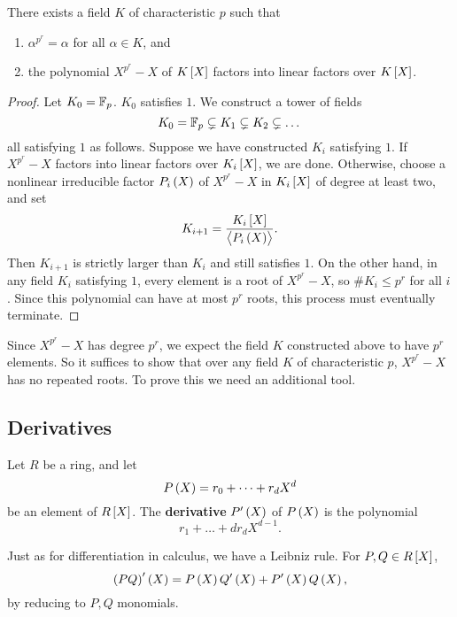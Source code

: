 \pagebreak

\begin{corollary}
There exists a field $ K $ of characteristic $ p $ such that
\begin{enumerate}
\item $ \alpha^{p^r} = \alpha $ for all $ \alpha \in K $, and
\item the polynomial $ X^{p^r} - X $ of $ K\sbr{X} $ factors into linear factors over $ K\sbr{X} $.
\end{enumerate}
\end{corollary}

\begin{proof}
Let $ K_0 = \mathbb{F}_p $. $ K_0 $ satisfies $ 1 $. We construct a tower of fields
$$ K_0 = \mathbb{F}_p \subsetneq K_1 \subsetneq K_2 \subsetneq \dots $$
all satisfying $ 1 $ as follows. Suppose we have constructed $ K_i $ satisfying $ 1 $. If $ X^{p^r} - X $ factors into linear factors over $ K_i\sbr{X} $, we are done. Otherwise, choose a nonlinear irreducible factor $ P_i\br{X} $ of $ X^{p^r} - X $ in $ K_i\sbr{X} $ of degree at least two, and set
$$ K_{i + 1} = \dfrac{K_i\sbr{X}}{\abr{P_i\br{X}}}. $$
Then $ K_{i + 1} $ is strictly larger than $ K_i $ and still satisfies $ 1 $. On the other hand, in any field $ K_i $ satisfying $ 1 $, every element is a root of $ X^{p^r} - X $, so $ \#K_i \le p^r $ for all $ i $. Since this polynomial can have at most $ p^r $ roots, this process must eventually terminate.
\end{proof}

Since $ X^{p^r} - X $ has degree $ p^r $, we expect the field $ K $ constructed above to have $ p^r $ elements. So it suffices to show that over any field $ K $ of characteristic $ p $, $ X^{p^r} - X $ has no repeated roots. To prove this we need an additional tool.

\subsection{Derivatives}

\begin{definition}
Let $ R $ be a ring, and let
$$ P\br{X} = r_0 + \dots + r_dX^d $$
be an element of $ R\sbr{X} $. The \textbf{derivative} $ P'\br{X} $ of $ P\br{X} $ is the polynomial
$$ r_1 + \dots + dr_dX^{d - 1}. $$
\end{definition}

\begin{note*}
Just as for differentiation in calculus, we have a Leibniz rule. For $ P, Q \in R\sbr{X} $,
$$ \br{PQ}'\br{X} = P\br{X}Q'\br{X} + P'\br{X}Q\br{X}, $$
by reducing to $ P, Q $ monomials.
\end{note*}

